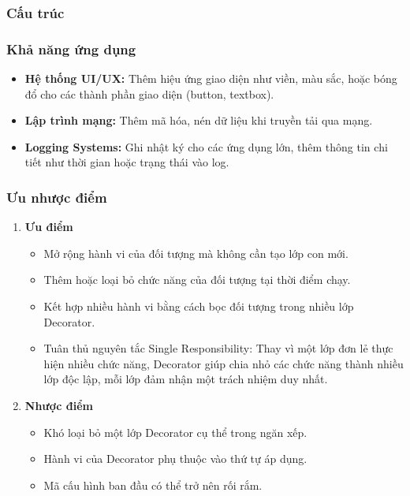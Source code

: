 \subsubsection{Cấu trúc}
\begin{flushleft}

\end{flushleft}

\subsubsection{Khả năng ứng dụng}
\begin{itemize}
    \item \textbf{Hệ thống UI/UX:} Thêm hiệu ứng giao diện như viền, màu sắc, hoặc bóng đổ cho các thành phần giao diện (button, textbox).
    \item \textbf{Lập trình mạng:} Thêm mã hóa, nén dữ liệu khi truyền tải qua mạng.
    \item \textbf{Logging Systems:} Ghi nhật ký cho các ứng dụng lớn, thêm thông tin chi tiết như thời gian hoặc trạng thái vào log.
\end{itemize}

\subsubsection{Ưu nhược điểm}
\begin{enumerate}
    \item \textbf{Ưu điểm}
          \begin{itemize}
              \item Mở rộng hành vi của đối tượng mà không cần tạo lớp con mới.
              \item Thêm hoặc loại bỏ chức năng của đối tượng tại thời điểm chạy.
              \item Kết hợp nhiều hành vi bằng cách bọc đối tượng trong nhiều lớp Decorator.
              \item Tuân thủ nguyên tắc Single Responsibility: Thay vì một lớp đơn lẻ thực hiện nhiều chức năng, Decorator giúp chia nhỏ các chức năng thành nhiều lớp độc lập, mỗi lớp đảm nhận một trách nhiệm duy nhất.
          \end{itemize}
    \item \textbf{Nhược điểm}
          \begin{itemize}
              \item Khó loại bỏ một lớp Decorator cụ thể trong ngăn xếp.
              \item Hành vi của Decorator phụ thuộc vào thứ tự áp dụng.
              \item Mã cấu hình ban đầu có thể trở nên rối rắm.
          \end{itemize}
\end{enumerate}

